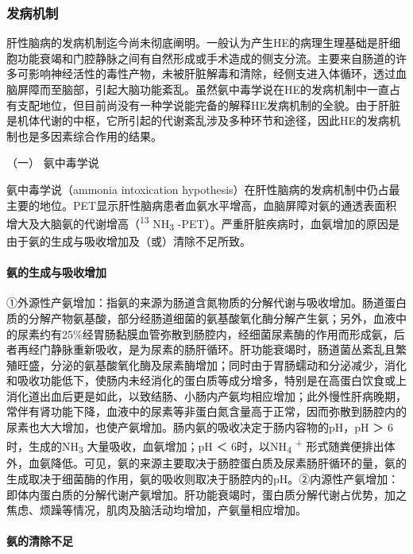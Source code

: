 \subsubsection{发病机制}

肝性脑病的发病机制迄今尚未彻底阐明。一般认为产生HE的病理生理基础是肝细胞功能衰竭和门腔静脉之间有自然形成或手术造成的侧支分流。主要来自肠道的许多可影响神经活性的毒性产物，未被肝脏解毒和清除，经侧支进入体循环，透过血脑屏障而至脑部，引起大脑功能紊乱。虽然氨中毒学说在HE的发病机制中一直占有支配地位，但目前尚没有一种学说能完备的解释HE发病机制的全貌。由于肝脏是机体代谢的中枢，它所引起的代谢紊乱涉及多种环节和途径，因此HE的发病机制也是多因素综合作用的结果。

\hypertarget{text00101.htmlux5cux23CHP4-3-4-2-1}{}
（一） 氨中毒学说

氨中毒学说（ammonia intoxication
hypothesis）在肝性脑病的发病机制中仍占最主要的地位。PET显示肝性脑病患者血氨水平增高，血脑屏障对氨的通透表面积增大及大脑氨的代谢增高（\textsuperscript{13}
NH\textsubscript{3}
-PET）。严重肝脏疾病时，血氨增加的原因是由于氨的生成与吸收增加及（或）清除不足所致。

\paragraph{氨的生成与吸收增加}

①外源性产氨增加：指氨的来源为肠道含氮物质的分解代谢与吸收增加。肠道蛋白质的分解产物氨基酸，部分经肠道细菌的氨基酸氧化酶分解产生氨；另外，血液中的尿素约有25\%经胃肠黏膜血管弥散到肠腔内，经细菌尿素酶的作用而形成氨，后者再经门静脉重新吸收，是为尿素的肠肝循环。肝功能衰竭时，肠道菌丛紊乱且繁殖旺盛，分泌的氨基酸氧化酶及尿素酶增加；同时由于胃肠蠕动和分泌减少，消化和吸收功能低下，使肠内未经消化的蛋白质等成分增多，特别是在高蛋白饮食或上消化道出血后更是如此，以致结肠、小肠内产氨均相应增加；此外慢性肝病晚期，常伴有肾功能下降，血液中的尿素等非蛋白氮含量高于正常，因而弥散到肠腔内的尿素也大大增加，也使产氨增加。肠内氨的吸收决定于肠内容物的pH，pH
＞ 6时，生成的NH\textsubscript{3} 大量吸收，血氨增加；pH ＜
6时，以NH\textsubscript{4} \textsuperscript{+}
形式随粪便排出体外，血氨降低。可见，氨的来源主要取决于肠腔蛋白质及尿素肠肝循环的量，氨的生成取决于细菌酶的作用，氨的吸收则取决于肠腔内的pH。②内源性产氨增加：即体内蛋白质的分解代谢产氨增加。肝功能衰竭时，蛋白质分解代谢占优势，加之焦虑、烦躁等情况，肌肉及脑活动均增加，产氨量相应增加。

\paragraph{氨的清除不足}

